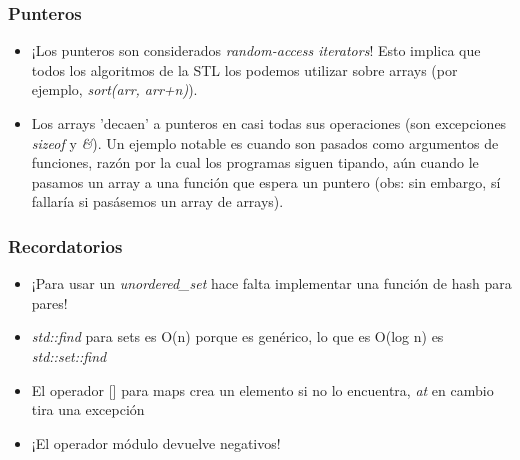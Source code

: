 \subsubsection*{Punteros}

\begin{itemize}
    \item ¡Los punteros son considerados \textit{random-access iterators}! Esto implica que todos los algoritmos de la STL los podemos utilizar sobre arrays (por ejemplo, \textit{sort(arr, arr+n)}).
    \item Los arrays 'decaen' a punteros en casi todas sus operaciones (son excepciones \textit{sizeof} y \textit{\&}). Un ejemplo notable es cuando son pasados como argumentos de funciones, razón por la cual los programas siguen tipando, aún cuando le pasamos un array a una función que espera un puntero (obs: sin embargo, sí fallaría si pasásemos un array de arrays).
\end{itemize}

\subsubsection*{Recordatorios}

\begin{itemize}
    \item ¡Para usar un \textit{unordered\_set} hace falta implementar una función de hash para pares!
    \item \textit{std::find} para sets es O(n) porque es genérico, lo que es O(log n) es \textit{std::set::find}
    \item El operador [] para maps crea un elemento si no lo encuentra, \textit{at} en cambio tira una excepción
    \item ¡El operador módulo devuelve negativos!
\end{itemize}
